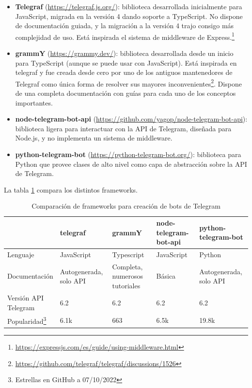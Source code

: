 \begin{itemize}
    \item \textbf{Telegraf} (\url{https://telegraf.js.org/}): biblioteca desarrollada inicialmente para JavaScript, migrada en la versión 4 dando soporte a TypeScript. No dispone de documentación guiada, y la migración a la versión 4 trajo consigo más complejidad de uso. Está inspirada el sistema de middleware de Express.\footnote{\url{https://expressjs.com/es/guide/using-middleware.html}}
    \item \textbf{grammY} (\url{https://grammy.dev/}): biblioteca desarrollada desde un inicio para TypeScript (aunque se puede usar con JavaScript). Está inspirada en telegraf y fue creada desde cero por uno de los antiguos mantenedores de Telegraf como única forma de resolver sus mayores inconvenientes\footnote{\url{https://github.com/telegraf/telegraf/discussions/1526}}. Dispone de una completa documentación con guías para cada uno de los conceptos importantes.
    \item \textbf{node-telegram-bot-api} (\url{https://github.com/yagop/node-telegram-bot-api}): biblioteca ligera para interactuar con la API de Telegram, diseñada para Node.js, y no implementa un sistema de middleware.
    \item \textbf{python-telegram-bot} (\url{https://python-telegram-bot.org/}): biblioteca para Python que provee clases de alto nivel como capa de abstracción sobre la API de Telegram.
\end{itemize}

La tabla \ref{tab:comparacionFrameworks} compara los distintos frameworks.

\begin{table}
\begin{minipage}{\textwidth}
\begin{tabularx}{\textwidth}{|l|X|X|X|X|}
\hline
& telegraf & grammY & node-telegram-bot-api & python-telegram-bot \\
\hline
Lenguaje & JavaScript & Typescript & JavaScript & Python \\
\hline
Documentación & Autogenerada, solo API & Completa, numerosos tutoriales & Básica & Autogenerada, solo API \\
\hline
\makecell[l]{Versión API \\Telegram} & 6.2 & 6.2 & 6.2 & 6.2 \\
\hline
Popularidad\footnote{Estrellas en GitHub a 07/10/2022} & 6.1k & 663 & 6.5k & 19.8k \\
\hline
\end{tabularx}
\end{minipage}
\caption{Comparación de frameworks para creación de bots de Telegram}\label{tab:comparacionFrameworks}
\end{table}

